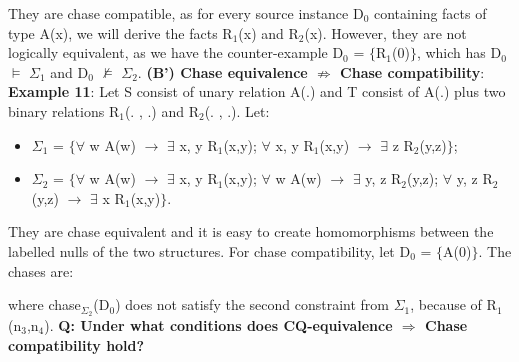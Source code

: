\documentclass[11pt, a4paper, dvipsnames]{article}
\begin{document}
They are chase compatible, as for every source instance D$_{0}$ containing facts of type A(x), we will derive the facts R$_{1}$(x) and R$_{2}$(x). However, they are not logically equivalent, as we have the counter-example D$_{0}$ = $\{$R$_{1}$(0)$\}$, which has D$_{0}$ $\vDash$ $\Sigma_{1}$ and D$_{0}$ $\nvDash$ $\Sigma_{2}$.\newline
\textbf{(B') Chase equivalence $\nRightarrow$ Chase compatibility}:\newline
\textbf{Example 11}: Let S consist of unary relation A(.) and T consist of A(.) plus two binary relations R$_{1}$(. , .) and R$_{2}$(. , .). Let:
\begin{itemize}
	\item $\Sigma_{1}$ = $\{\forall$ w A(w) $\rightarrow$ $\exists$ x, y R$_{1}$(x,y); $\forall$ x, y R$_{1}$(x,y) $\rightarrow$ $\exists$ z R$_{2}$(y,z)$\}$;
	\item $\Sigma_{2}$ = $\{\forall$ w A(w) $\rightarrow$ $\exists$ x, y R$_{1}$(x,y); $\forall$ w A(w) $\rightarrow$ $\exists$ y, z R$_{2}$(y,z); $\forall$ y, z R$_{2}$(y,z) $\rightarrow$ $\exists$ x R$_{1}$(x,y)$\}$.
\end{itemize}
They are chase equivalent and it is easy to create homomorphisms between the labelled nulls of the two structures. For chase compatibility, let D$_{0}$ = $\{$A(0)$\}$. The chases are:
\begin{center}
\end{center}
where chase$_{\Sigma_{2}}$(D$_{0}$) does not satisfy the second constraint from $\Sigma_{1}$, because of R$_{1}$(n$_{3}$,n$_{4}$).\newline
\textbf{Q: Under what conditions does CQ-equivalence $\Rightarrow$ Chase compatibility hold?}\newline
\end{document}

